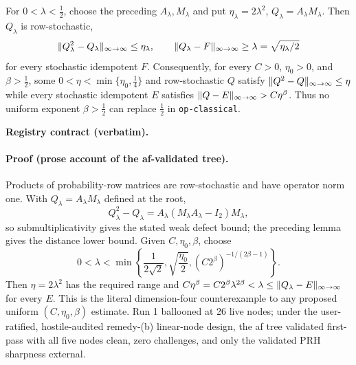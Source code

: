 \begin{corollary}\label{cor:classical-sharpness}
For $0<\lambda<\tfrac12$, choose the preceding $A_\lambda,M_\lambda$ and put
$\eta_\lambda=2\lambda^2$, $Q_\lambda=A_\lambda M_\lambda$.  Then $Q_\lambda$ is
row-stochastic,
\[
\lVert Q_\lambda^2-Q_\lambda \rVert_{\infty\to\infty}\le\eta_\lambda,
\qquad
\lVert Q_\lambda-F \rVert_{\infty\to\infty}\ge\lambda=\sqrt{\eta_\lambda/2}
\]
for every stochastic idempotent $F$.  Consequently, for every $C>0$, $\eta_0>0$, and
$\beta>\tfrac12$, some $0<\eta<\min\{\eta_0,\tfrac14\}$ and row-stochastic $Q$ satisfy
$\lVert Q^2-Q \rVert_{\infty\to\infty}\le\eta$ while every stochastic idempotent $E$ satisfies
$\lVert Q-E \rVert_{\infty\to\infty}>C\eta^\beta$.  Thus no uniform exponent $\beta>\tfrac12$ can replace
$\tfrac12$ in \texttt{op-classical}.
\end{corollary}

\noindent\textbf{Registry contract (verbatim).}

\paragraph{Proof (prose account of the af-validated tree).}
Products of probability-row matrices are row-stochastic and have operator norm one.  With
$Q_\lambda=A_\lambda M_\lambda$ defined at the root,
\[
Q_\lambda^2-Q_\lambda=A_\lambda(M_\lambda A_\lambda-I_2)M_\lambda,
\]
so submultiplicativity gives the stated weak defect bound; the preceding lemma gives the
distance lower bound.  Given $C,\eta_0,\beta$, choose
\[
0<\lambda<\min\left\{\frac1{2\sqrt2},\sqrt{\frac{\eta_0}{2}},
(C2^\beta)^{-1/(2\beta-1)}\right\}.
\]
Then $\eta=2\lambda^2$ has the required range and
$C\eta^\beta=C2^\beta\lambda^{2\beta}<\lambda\le\lVert Q_\lambda-E \rVert_{\infty\to\infty}$ for every $E$.
This is the literal dimension-four counterexample to any proposed uniform
$(C,\eta_0,\beta)$ estimate.  Run 1 ballooned at 26 live nodes; under the user-ratified,
hostile-audited remedy-(b) linear-node design, the af tree validated first-pass with all
five nodes clean, zero challenges, and only the validated PRH sharpness external.
